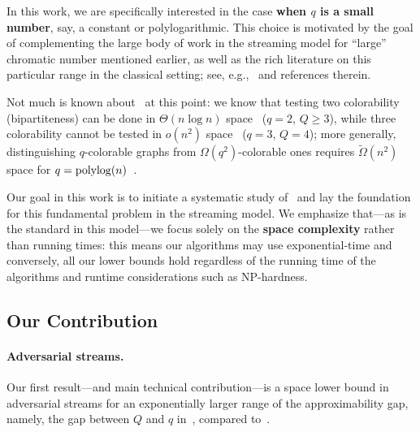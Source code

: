 \documentclass[11pt]{article}
\theoremstyle{definition}
\renewcommand{\geq}{\geqslant}
\newcommand{\Omgt}{\ensuremath{\widetilde{\Omega}}}
\newcommand{\poly}{\mbox{\rm poly}}
\begin{document}
In this work, we are specifically interested in the case \textbf{when $q$ is a small number}, say, a constant or polylogarithmic. This choice is motivated
by the goal of complementing the large body of work in the streaming model for ``large'' chromatic number mentioned earlier, as well as the rich literature on this particular range
in the classical setting; see, e.g.,~\cite{Furer95,KhannaLS00,Khot01,GuruswamiK04,DinurMR06,Huang13,BrakensiekG16,KrokhinOWZ23} and references therein. 


Not much is known about~ at this point: we know 
that testing two colorability (bipartiteness) can be done in $\Theta(n\log{n})$ space~\cite{FeigenbaumKMSZ04,SunW15} ($q=2$, $Q \geq 3$), while three colorability cannot be tested in $o(n^2)$ space~\cite{AbboudCKP21} ($q=3$, $Q=4$); 
more generally, distinguishing $q$-colorable graphs from $\Omega(q^2)$-colorable ones requires $\Omgt(n^2)$ space for $q = \poly\!\log{\!(n)}$~\cite{CormodeDK19}. 

Our goal in this work is to initiate a systematic study of~ and lay the foundation for this fundamental problem in the streaming model. We emphasize that---as is the standard in this model---we focus
 solely on the \textbf{space complexity} rather than running times: this means our algorithms may use exponential-time and conversely, all our lower bounds hold regardless of the running time of the algorithms and runtime considerations
 such as NP-hardness. 
 


\subsection{Our Contribution} 

\paragraph{Adversarial streams.} Our first result---and main technical contribution---is a space lower bound in adversarial streams for an exponentially larger range of the approximability gap, namely, the gap between $Q$ and $q$ in~, compared to~\cite{CormodeDK19}. 
\end{document}
